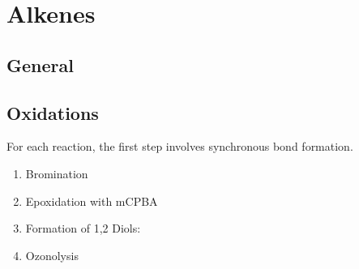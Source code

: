 \section{Alkenes}

\subsection{General}


\subsection{Oxidations}

For each reaction, the first step involves synchronous bond formation.

\begin{enumerate}
    \item Bromination
    \item Epoxidation with mCPBA
    \item Formation of 1,2 Diols:
    \item Ozonolysis
\end{enumerate}